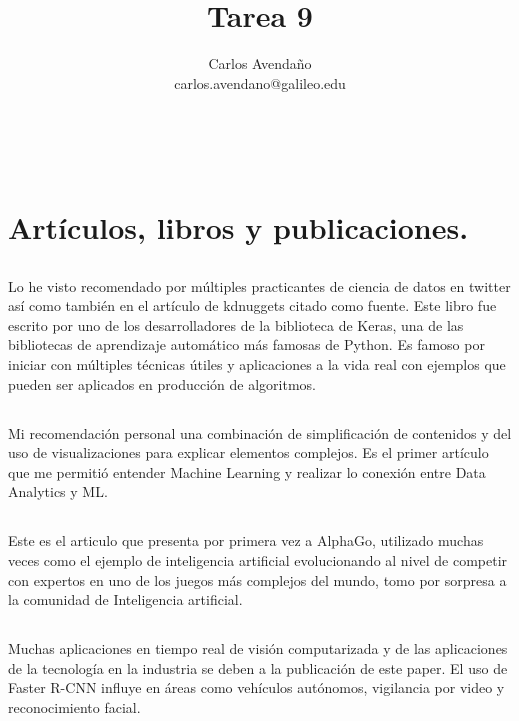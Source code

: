 \documentclass[12pt,letterpaper]{article}
\makeatletter
\renewcommand{\maketitle}{\bgroup
   \begin{center}
   \textbf{{\fontsize{18pt}{20}\selectfont \@title}}\\
   \vspace{10pt}
   {\fontsize{12pt}{0}\selectfont \@author} 
   \end{center}
}
\makeatother
\begin{document}
\title{Tarea 9}
\author{Carlos Avendaño\\ carlos.avendano@galileo.edu}

\maketitle
\thispagestyle{fancy}

\section*{Artículos, libros y publicaciones.}

\subsection*{}
Lo he visto recomendado por múltiples practicantes de ciencia de datos en twitter así como también en el artículo de kdnuggets citado como fuente. Este libro fue escrito por uno de los desarrolladores de la biblioteca de Keras, una de las bibliotecas de aprendizaje automático más famosas de Python. Es famoso por iniciar con múltiples técnicas útiles y aplicaciones a la vida real con ejemplos que pueden ser aplicados en producción de algoritmos.

\subsection*{}
Mi recomendación personal una combinación de simplificación de contenidos y del uso de visualizaciones para explicar elementos complejos. Es el primer artículo que me permitió entender Machine Learning y realizar lo conexión entre Data Analytics y ML.

\subsection*{}
Este es el articulo que presenta por primera vez a AlphaGo, utilizado muchas veces como el ejemplo de inteligencia artificial evolucionando al nivel de competir con expertos en uno de los juegos más complejos del mundo, tomo por sorpresa a la comunidad de Inteligencia artificial. 

\subsection*{}
Muchas aplicaciones en tiempo real de visión computarizada y de  las aplicaciones de la tecnología en la industria se deben a la publicación de este paper. El uso de Faster R-CNN influye en áreas como vehículos autónomos, vigilancia por video y reconocimiento facial.

 
\end{document}
